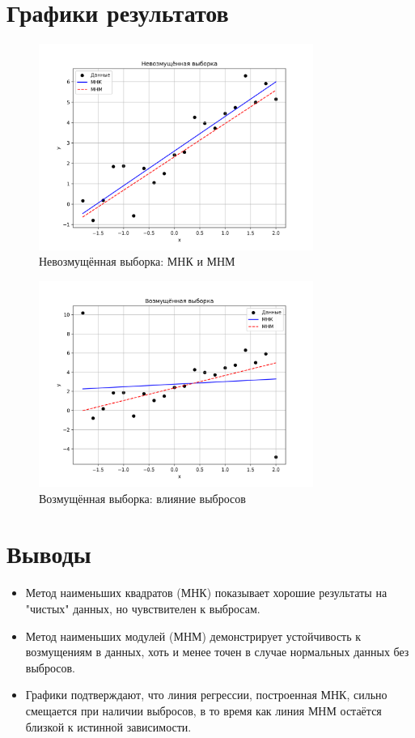 \documentclass[a4paper]{article}
\begin{document}
    \section{Графики результатов}

    \begin{figure}[H]
        \centering
        \includegraphics[width=0.8\textwidth]{regression_clean}
        \caption{Невозмущённая выборка: МНК и МНМ}
    \end{figure}

    \begin{figure}[H]
        \centering
        \includegraphics[width=0.8\textwidth]{regression_perturbed}
        \caption{Возмущённая выборка: влияние выбросов}
    \end{figure}


    \section{Выводы}

    \begin{itemize}
        \item Метод наименьших квадратов (МНК) показывает хорошие результаты на "чистых" данных, но чувствителен к выбросам.
        \item Метод наименьших модулей (МНМ) демонстрирует устойчивость к возмущениям в данных, хоть и менее точен в случае нормальных данных без выбросов.
        \item Графики подтверждают, что линия регрессии, построенная МНК, сильно смещается при наличии выбросов, в то время как линия МНМ остаётся близкой к истинной зависимости.
    \end{itemize}
\end{document}
